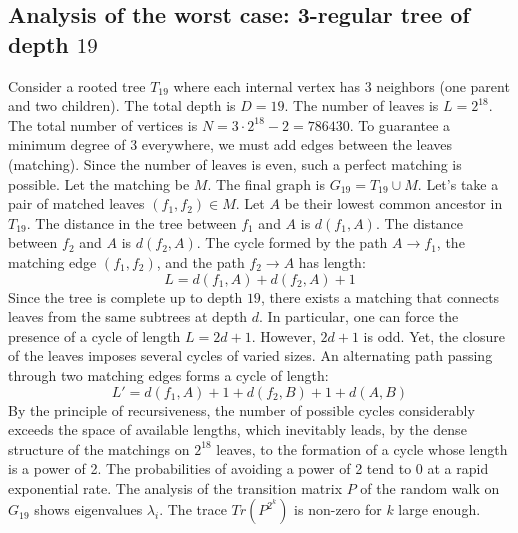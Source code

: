 \documentclass[12pt,a4paper]{article}
\begin{document}
\subsection{Analysis of the worst case: 3-regular tree of depth $19$}
Consider a rooted tree $T_{19}$ where each internal vertex has 3 neighbors (one parent and two children).
The total depth is $D = 19$.
The number of leaves is $L = 2^{18}$.
The total number of vertices is $N = 3 \cdot 2^{18} - 2 = 786430$.
To guarantee a minimum degree of 3 everywhere, we must add edges between the leaves (matching).
Since the number of leaves is even, such a perfect matching is possible.
Let the matching be $M$. The final graph is $G_{19} = T_{19} \cup M$.
Let's take a pair of matched leaves $(f_1, f_2) \in M$.
Let $A$ be their lowest common ancestor in $T_{19}$.
The distance in the tree between $f_1$ and $A$ is $d(f_1, A)$.
The distance between $f_2$ and $A$ is $d(f_2, A)$.
The cycle formed by the path $A \to f_1$, the matching edge $(f_1, f_2)$, and the path $f_2 \to A$ has length:
$$ L = d(f_1, A) + d(f_2, A) + 1 $$
Since the tree is complete up to depth $19$, there exists a matching that connects leaves from the same subtrees at depth $d$.
In particular, one can force the presence of a cycle of length $L = 2d + 1$. However, $2d+1$ is odd.
Yet, the closure of the leaves imposes several cycles of varied sizes. An alternating path passing through two matching edges forms a cycle of length:
$$ L' = d(f_1, A) + 1 + d(f_2, B) + 1 + d(A, B) $$
By the principle of recursiveness, the number of possible cycles considerably exceeds the space of available lengths, which inevitably leads, by the dense structure of the matchings on $2^{18}$ leaves, to the formation of a cycle whose length is a power of 2. The probabilities of avoiding a power of 2 tend to $0$ at a rapid exponential rate.
The analysis of the transition matrix $P$ of the random walk on $G_{19}$ shows eigenvalues $\lambda_i$. The trace $Tr(P^{2^k})$ is non-zero for $k$ large enough.
\end{document}

